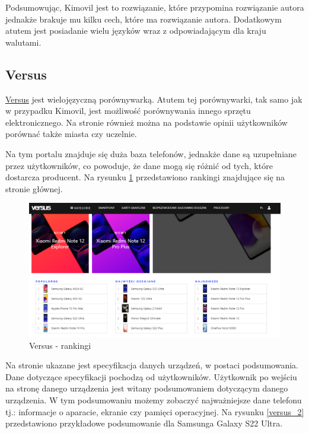 Podsumowując, Kimovil jest to rozwiązanie, które przypomina rozwiązanie autora jednakże brakuje mu kilku cech, które ma rozwiązanie autora. Dodatkowym atutem jest posiadanie wielu języków wraz z odpowiadającym dla kraju walutami.

\subsection{Versus}
\href{https://versus.com/}{Versus} \cite{versus} jest wielojęzyczną porównywarką. Atutem tej porównywarki, tak samo jak w przypadku Kimovil, jest możliwość porównywania innego sprzętu elektronicznego. Na stronie również można na podstawie opinii użytkowników porównać także miasta czy uczelnie.

Na tym portalu znajduje się duża baza telefonów, jednakże dane są uzupełniane przez użytkowników, co powoduje, że dane mogą się różnić od tych, które dostarcza producent. Na rysunku \ref*{versus_1} przedstawiono rankingi znajdujące się na stronie głównej.
\begin{figure}[ht]
    \centering
    \includegraphics[scale=0.45]{img/versus/versusRankingi.png}
    \caption{Versus - rankingi}
    \label{versus_1}
\end{figure}
Na stronie ukazane jest specyfikacja danych urządzeń, w postaci podsumowania. Dane dotyczące specyfikacji pochodzą od użytkowników. Użytkownik po wejściu na stronę danego urządzenia jest witany podsumowaniem dotyczącym danego urządzenia. W tym podsumowaniu możemy zobaczyć najważniejsze dane telefonu tj.: informacje o aparacie, ekranie czy pamięci operacyjnej. Na rysunku \ref*{versus_2} przedstawiono przykładowe podsumowanie dla Samsunga Galaxy S22 Ultra.
